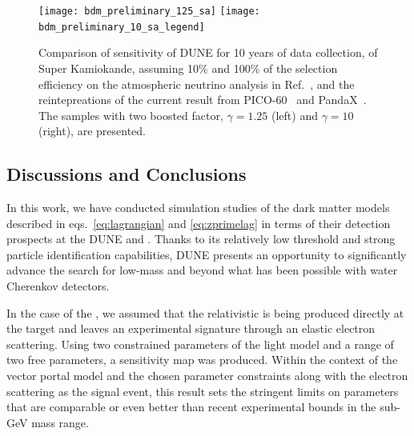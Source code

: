 \begin{figure}[!htb]
\centering
\texttt{[image: bdm\_preliminary\_125\_sa]}\hspace{0.05\textwidth}
\texttt{[image: bdm\_preliminary\_10\_sa\_legend]}
\caption{Comparison of sensitivity of DUNE for 10 years of data collection, of Super Kamiokande, assuming 10\% and 100\% of the selection efficiency on the atmospheric neutrino analysis in Ref.~\cite{Fechner:2009aa}, and the reintepreations of the current result from PICO-60~\cite{Amole:2019fdf} and PandaX~\cite{Xia:2018qgs}.  The samples with two boosted factor, $\gamma = 1.25$ (left) and $\gamma = 10$ (right), are presented. \label{fig:bdm_sensitivity_comparison}}
\end{figure}

\subsection{Discussions and Conclusions}

In this work, we have conducted simulation studies of the dark matter models described in eqs.~\eqref{eq:lagrangian} and \eqref{eq:zprimelag} in terms of their detection prospects at the DUNE  and . 
Thanks to its relatively low threshold and strong particle identification capabilities, DUNE presents an opportunity to significantly advance the search for low-mass  and  beyond what has been possible with water Cherenkov detectors.

In the case of the , we assumed that the relativistic  is being produced directly at the target and leaves an experimental signature through an elastic electron scattering. Using two constrained parameters of the light  model and a range of two free parameters, a sensitivity map was produced. Within the context of the vector portal  model and the chosen parameter constraints along with the electron scattering as the signal event, this result sets the stringent limits on  parameters that are comparable or even better than recent experimental bounds in the sub-GeV mass range.

